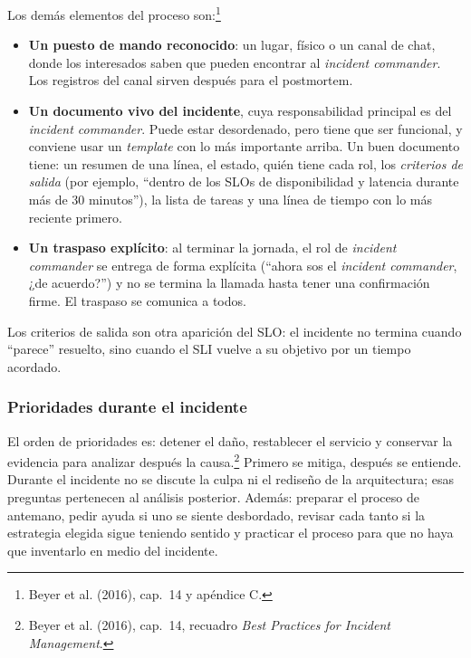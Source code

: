 \documentclass[variant=apuntes,cover=institutional,mode=screen]{ua-engineering-v6-article}
\begin{document}
Los demás elementos del proceso son:\footnote{Beyer et al. (2016), cap.~14 y apéndice C.}
\begin{itemize}
\item \textbf{Un puesto de mando reconocido}: un lugar, físico o un canal de chat, donde los interesados saben que pueden encontrar al \emph{incident commander}. Los registros del canal sirven después para el postmortem.
\item \textbf{Un documento vivo del incidente}, cuya responsabilidad principal es del \emph{incident commander}. Puede estar desordenado, pero tiene que ser funcional, y conviene usar un \emph{template} con lo más importante arriba. Un buen documento tiene: un resumen de una línea, el estado, quién tiene cada rol, los \emph{criterios de salida} (por ejemplo, ``dentro de los SLOs de disponibilidad y latencia durante más de 30 minutos''), la lista de tareas y una línea de tiempo con lo más reciente primero.
\item \textbf{Un traspaso explícito}: al terminar la jornada, el rol de \emph{incident commander} se entrega de forma explícita (``ahora sos el \emph{incident commander}, ¿de acuerdo?'') y no se termina la llamada hasta tener una confirmación firme. El traspaso se comunica a todos.
\end{itemize}

Los criterios de salida son otra aparición del SLO: el incidente no termina cuando ``parece'' resuelto, sino cuando el SLI vuelve a su objetivo por un tiempo acordado.

\subsubsection{Prioridades durante el incidente}

El orden de prioridades es: detener el daño, restablecer el servicio y conservar la evidencia para analizar después la causa.\footnote{Beyer et al. (2016), cap.~14, recuadro \emph{Best Practices for Incident Management}.} Primero se mitiga, después se entiende. Durante el incidente no se discute la culpa ni el rediseño de la arquitectura; esas preguntas pertenecen al análisis posterior. Además: preparar el proceso de antemano, pedir ayuda si uno se siente desbordado, revisar cada tanto si la estrategia elegida sigue teniendo sentido y practicar el proceso para que no haya que inventarlo en medio del incidente.
\end{document}
